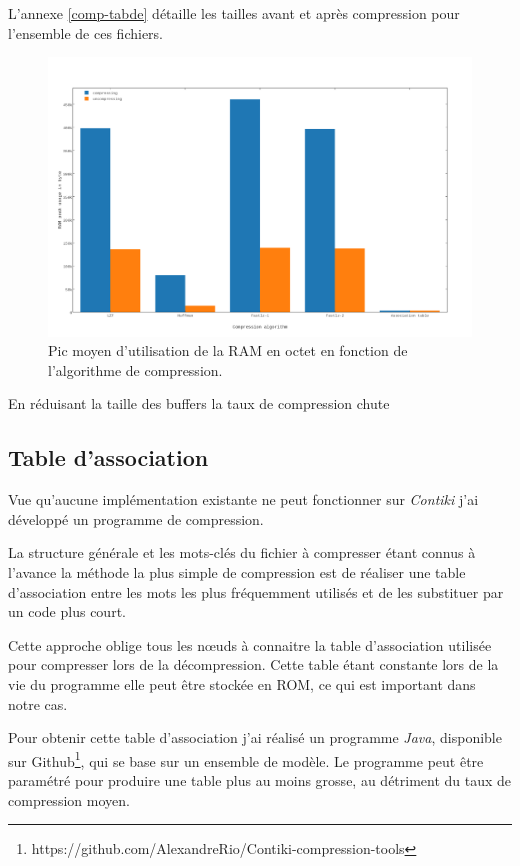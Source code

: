 L'annexe \ref{comp-tabde} détaille les tailles avant et après compression pour l'ensemble de ces fichiers.

\begin{figure}[ht!]
\centering
\includegraphics[scale=0.4]{images/comp-memory.png}
\caption{Pic moyen d'utilisation de la RAM en octet en fonction de l'algorithme de compression.}
\end{figure}

En réduisant la taille des buffers la taux de compression chute

\subsection{Table d'association}

Vue qu'aucune implémentation existante ne peut fonctionner sur \emph{Contiki} j'ai développé un programme de compression.

La structure générale et les mots-clés du fichier à compresser étant connus à l'avance la méthode la plus simple de compression est de réaliser une table d'association entre les mots les plus fréquemment utilisés et de les substituer par un code plus court.

Cette approche oblige tous les nœuds à connaitre la table d'association utilisée pour compresser lors de la décompression. Cette table étant constante lors de la vie du programme elle peut être stockée en ROM, ce qui est important dans notre cas.

Pour obtenir cette table d'association j'ai réalisé un programme \emph{Java}, disponible sur Github\footnote{https://github.com/AlexandreRio/Contiki-compression-tools}, qui se base sur un ensemble de modèle. Le programme peut être paramétré pour produire une table plus au moins grosse, au détriment du taux de compression moyen.

